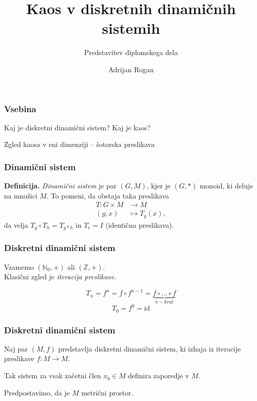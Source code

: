 \documentclass[12pt]{beamer}
\title{Kaos v diskretnih dinamičnih sistemih}
\subtitle{Predstavitev diplomskega dela}
\author{Adrijan Rogan}
\date{}
\newcommand{\N}{\mathbb N}
\newcommand{\Z}{\mathbb Z}
\begin{document}



\begin{frame}
\frametitle{Vsebina}
Kaj je diskretni dinamični sistem? Kaj je kaos?

\bigskip

Zgled kaosa v eni dimenziji -- šotorska preslikava

\end{frame}


\begin{frame}
\frametitle{Dinamični sistem}

\textbf{Definicija.} \emph{Dinamični sistem} je par $(G,M)$, kjer je $(G,*)$ monoid, ki deluje na množici $M$. To pomeni, da obstaja taka preslikava
\begin{align*}
T\colon G \times M & \longrightarrow M \\
(g, x) & \longmapsto T_g(x),
\end{align*}
da velja $T_g \circ T_h = T_{g * h}$ in $T_e = I$ (identična preslikava).
\end{frame}


\begin{frame}
\frametitle{Diskretni dinamični sistem}
Vzamemo $(\N_0, +)$ ali $(\Z, +)$. \\
Klasični zgled je \emph{iteracija preslikave}.

\bigskip

$$ T_n = f^n = f \circ f^{n-1} = \underbrace{f \circ \dots \circ f}_{n-krat} $$
$$ T_0 = f^0 = \mathrm{id} $$ 
\end{frame}


\begin{frame}
\frametitle{Diskretni dinamični sistem}
Naj par $(M, f)$ predstavlja diskretni dinamični sistem, ki izhaja iz iteracije preslikave $f: M \rightarrow M$.

\medskip

Tak sistem za vsak začetni člen $x_0 \in M$ definira zaporedje v $M$.

\bigskip

Predpostavimo, da je $M$ metrični prostor.

\end{frame}
\end{document}
